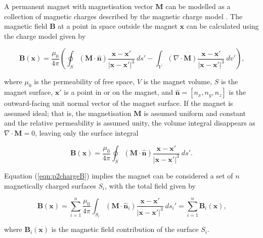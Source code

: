 A permanent magnet with magnetisation vector \(\mathbf{M}\) can be modelled as a collection of magnetic charges described by the magnetic charge model \cite{Furlani2001}. The magnetic field \(\mathbf{B}\) at a point in space outside the magnet \(\mathbf{x}\) can be calculated using the charge model given by

\begin{equation}
\label{eqn:p2chargemodel}
\mathbf{B}\left( \mathbf{x} \right) = \frac{\mu_0}{4\pi} \left( \oint_{S} \left( \mathbf{M} \cdot \hat{\mathbf{n}} \right) \frac{\mathbf{x} - \mathbf{x}'}{\left| \mathbf{x} - \mathbf{x}' \right|^3} \ ds' - \int_{V} \left( \nabla \cdot \mathbf{M} \right) \frac{\mathbf{x} - \mathbf{x}'}{\left| \mathbf{x} - \mathbf{x}' \right|^3} \ dv' \right) \text{,}
\end{equation}

\noindent where \(\mu_0\) is the permeability of free space, \(V\) is the magnet volume, \(S\) is the magnet surface, \(\mathbf{x}'\) is a point in or on the magnet, and \(\hat{\mathbf{n}} = \left[ n_x, n_y, n_z \right]\) is the outward-facing unit normal vector of the magnet surface. If the magnet is assumed ideal; that is, the magnetisation \(\mathbf{M}\) is assumed uniform and constant and the relative permeability is assumed unity, the volume integral disappears as \(\nabla \cdot \mathbf{M} = 0\), leaving only the surface integral

\begin{equation}
\label{eqn:p2chargeB}
\mathbf{B}\left( \mathbf{x} \right) = \frac{\mu_0}{4\pi} \oint_{S} \left( \mathbf{M} \cdot \hat{\mathbf{n}} \right) \frac{\mathbf{x} - \mathbf{x}'}{\left| \mathbf{x} - \mathbf{x}' \right|^3} \ ds' \text{.}
\end{equation}

\noindent Equation (\ref{eqn:p2chargeB}) implies the magnet can be considered a set of \(n\) magnetically charged surfaces \(S_{\!i}\), with the total field given by

\begin{equation}
\label{eqn:p2chargeBdiscrete}
\mathbf{B}\left( \mathbf{x} \right) = \sum_{i=1}^n \frac{\mu_0}{4\pi} \int_{S_i} \left( \mathbf{M} \cdot \hat{\mathbf{n}}_i \right) \frac{\mathbf{x} - \mathbf{x}'}{\left| \mathbf{x} - \mathbf{x}' \right|^3} \ ds_i' = \sum_{i=1}^n \textbf{B}_i\left(\textbf{x}\right) \text{,}
\end{equation}

\noindent where \(\textbf{B}_i\left(\mathbf{x}\right)\) is the magnetic field contribution of the surface \(S_{\!i}\).

